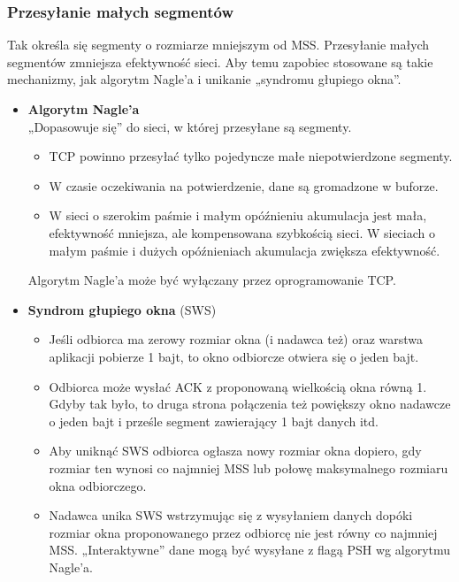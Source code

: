 \documentclass[a4paper]{article}
\begin{document}
\subsubsection{Przesyłanie małych segmentów}
Tak określa się segmenty o rozmiarze mniejszym od MSS.
Przesyłanie małych segmentów zmniejsza efektywność sieci.
Aby temu zapobiec stosowane są takie mechanizmy, jak algorytm Nagle’a i unikanie
„syndromu głupiego okna”.
\begin{itemize}
    \item \textbf{Algorytm Nagle’a}\\
    „Dopasowuje się” do sieci, w której przesyłane są segmenty.
    \begin{itemize}
        \item TCP powinno przesyłać tylko pojedyncze małe niepotwierdzone segmenty.
        \item W czasie oczekiwania na potwierdzenie, dane są gromadzone w buforze.
        \item W sieci o szerokim paśmie i małym opóźnieniu akumulacja jest mała, efektywność
        mniejsza, ale kompensowana szybkością sieci. W sieciach o małym paśmie i dużych
        opóźnieniach akumulacja zwiększa efektywność.
    \end{itemize}
    Algorytm Nagle’a może być wyłączany przez oprogramowanie TCP.
    \item \textbf{Syndrom głupiego okna} (SWS)\\
    \begin{itemize}
        \item Jeśli odbiorca ma zerowy rozmiar okna (i nadawca też) oraz warstwa aplikacji pobierze 1
        bajt, to okno odbiorcze otwiera się o jeden bajt.
        \item Odbiorca może wysłać ACK z proponowaną wielkością okna równą 1. Gdyby tak było, to
        druga strona połączenia też powiększy okno nadawcze o jeden bajt i prześle segment
        zawierający 1 bajt danych itd.
        \item Aby uniknąć SWS odbiorca ogłasza nowy rozmiar okna dopiero, gdy rozmiar ten wynosi co
        najmniej MSS lub połowę maksymalnego rozmiaru okna odbiorczego.
        \item Nadawca unika SWS wstrzymując się z wysyłaniem danych dopóki rozmiar okna proponowanego przez odbiorcę nie jest równy co najmniej MSS. „Interaktywne” dane mogą być wysyłane z flagą PSH wg algorytmu Nagle’a.
    \end{itemize}
\end{itemize}
\end{document}
